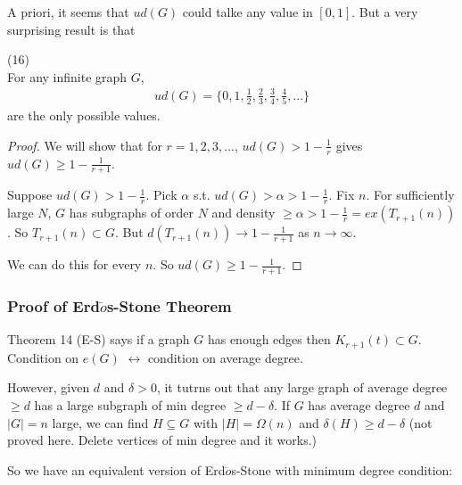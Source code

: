 \documentclass[a4paper]{article}
\begin{document}
A priori, it seems that $ud(G)$ could talke any value in $[0,1]$. But a very surprising result is that

\begin{coro} (16)\\
For any infinite graph $G$,
\begin{equation*}
\begin{aligned}
ud(G) = \{0,1,\frac{1}{2},\frac{2}{3},\frac{3}{4}, \frac{4}{5},...\}
\end{aligned}
\end{equation*}
are the only possible values.
\begin{proof}
We will show that for $r=1,2,3,...$, $ud(G) > 1-\frac{1}{r}$ gives $ud(G) \geq 1-\frac{1}{r+1}$.

Suppose $ud(G) > 1-\frac{1}{r}$. Pick $\alpha$ s.t. $ud(G) > \alpha > 1-\frac{1}{r}$. Fix $n$. For sufficiently large $N$, $G$ has subgraphs of order $N$ and density $\geq \alpha > 1-\frac{1}{r} = ex(T_{r+1}(n))$. So $T_{r+1}(n) \subset G$. But $d (T_{r+1} (n)) \to 1-\frac{1}{r+1}$ as $n \to \infty$. 

We can do this for every $n$. So $ud(G) \geq 1-\frac{1}{r+1}$.
\end{proof}
\end{coro}

\subsubsection{Proof of Erd$\ddot{o}$s-Stone Theorem}
Theorem 14 (E-S) says if a graph $G$ has enough edges then $K_{r+1}(t) \subset G$. Condition on $e(G)$ $\leftrightarrow$ condition on average degree.

However, given $d$ and $\delta>0$, it tutrns out that any large graph of average degree $\geq d$ has a large subgraph of min degree $\geq d-\delta$. If $G$ has average degree $d$ and $|G| = n$ large, we can find $H \subseteq G$ with $|H| = \Omega(n)$ and $\delta(H) \geq d-\delta$ (not proved here. Delete vertices of min degree and it works.)

So we have an equivalent version of Erd$\ddot{o}$s-Stone with minimum degree condition:
\end{document}
